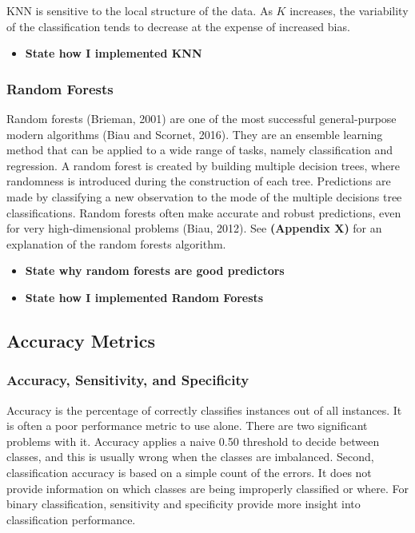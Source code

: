 \documentclass[12pt,]{article}
\providecommand{\tightlist}{%
  \setlength{\itemsep}{0pt}\setlength{\parskip}{0pt}}
\begin{document}
KNN is sensitive to the local structure of the data. As \(K\) increases,
the variability of the classification tends to decrease at the expense
of increased bias.

\begin{itemize}
\tightlist
\item
  \textbf{State how I implemented KNN}
\end{itemize}

\subsubsection{Random Forests}\label{random-forests}

Random forests (Brieman, 2001) are one of the most successful
general-purpose modern algorithms (Biau and Scornet, 2016). They are an
ensemble learning method that can be applied to a wide range of tasks,
namely classification and regression. A random forest is created by
building multiple decision trees, where randomness is introduced during
the construction of each tree. Predictions are made by classifying a new
observation to the mode of the multiple decisions tree classifications.
Random forests often make accurate and robust predictions, even for very
high-dimensional problems (Biau, 2012). See \textbf{(Appendix X)} for an
explanation of the random forests algorithm.

\begin{itemize}
\item
  \textbf{State why random forests are good predictors}
\item
  \textbf{State how I implemented Random Forests}
\end{itemize}

\subsection{Accuracy Metrics}\label{accuracy-metrics}

\subsubsection{Accuracy, Sensitivity, and
Specificity}\label{accuracy-sensitivity-and-specificity}

Accuracy is the percentage of correctly classifies instances out of all
instances. It is often a poor performance metric to use alone. There are
two significant problems with it. Accuracy applies a naive 0.50
threshold to decide between classes, and this is usually wrong when the
classes are imbalanced. Second, classification accuracy is based on a
simple count of the errors. It does not provide information on which
classes are being improperly classified or where. For binary
classification, sensitivity and specificity provide more insight into
classification performance.
\end{document}
